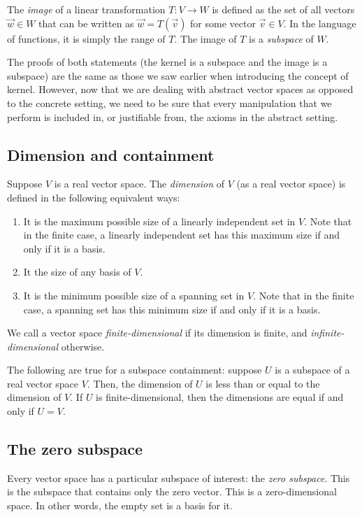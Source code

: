 \documentclass[10pt]{amsart}
\begin{document}
The {\em image} of a linear transformation $T:V \to W$ is defined as
the set of all vectors $\vec{w} \in W$ that can be written as $\vec{w}
= T(\vec{v})$ for some vector $\vec{v} \in V$. In the language of
functions, it is simply the range of $T$. The image of $T$ is a {\em
  subspace} of $W$.

The proofs of both statements (the kernel is a subspace and the image
is a subspace) are the same as those we saw earlier when introducing
the concept of kernel. However, now that we are dealing with abstract
vector spaces as opposed to the concrete setting, we need to be sure
that every manipulation that we perform is included in, or justifiable
from, the axioms in the abstract setting.

\subsection{Dimension and containment}

Suppose $V$ is a real vector space. The {\em dimension} of $V$ (as a
real vector space) is defined in the following equivalent ways:

\begin{enumerate}
\item It is the maximum possible size of a linearly independent set in
  $V$. Note that in the finite case, a linearly independent set has
  this maximum size if and only if it is a basis.
\item It the size of any basis of $V$.
\item It is the minimum possible size of a spanning set in $V$. Note
  that in the finite case, a spanning set has this minimum size if and
  only if it is a basis.
\end{enumerate}

We call a vector space {\em finite-dimensional} if its dimension is
finite, and {\em infinite-dimensional} otherwise.

The following are true for a subspace containment: suppose $U$ is a
subspace of a real vector space $V$. Then, the dimension of $U$ is
less than or equal to the dimension of $V$. If $U$ is
finite-dimensional, then the dimensions are equal if and only if $U =
V$.

\subsection{The zero subspace}

Every vector space has a particular subspace of interest: the {\em
  zero subspace}. This is the subspace that contains only the zero
vector. This is a zero-dimensional space. In other words, the empty
set is a basis for it.
\end{document}
